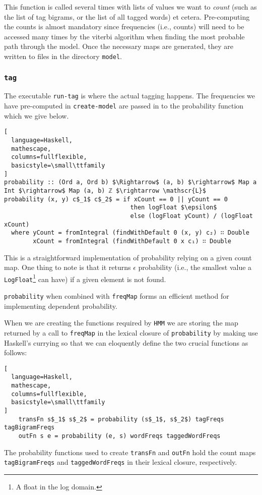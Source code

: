 \documentclass{article}
\begin{document}
This function is called several times with lists of values we want to
\emph{count} (such as the list of tag bigrams, or the list of all tagged words)
et cetera. Pre-computing the counts is almost mandatory since frequencies (i.e.,
counts) will need to be accessed many times by the viterbi algorithm when
finding the most probable path through the model. Once the necessary maps are
generated, they are written to files in the directory \texttt{model}.

\subsubsection{\texttt{tag}}
\label{par:tag}

The executable \texttt{run-tag} is where the actual tagging happens. The
frequencies we have pre-computed in \texttt{create-model} are passed in to the
probability function which we give below.
\begin{lstlisting}[
  language=Haskell,
  mathescape,
  columns=fullflexible,
  basicstyle=\small\ttfamily
]
probability :: (Ord a, Ord b) $\Rightarrow$ (a, b) $\rightarrow$ Map a Int $\rightarrow$ Map (a, b) ℤ $\rightarrow \mathscr{L}$
probability (x, y) c$_1$ c$_2$ = if xCount == 0 || yCount == 0
                                   then logFloat $\epsilon$
                                   else (logFloat yCount) / (logFloat xCount)
  where yCount = fromIntegral (findWithDefault 0 (x, y) c₂) ∷ Double
        xCount = fromIntegral (findWithDefault 0 x c₁) ∷ Double
\end{lstlisting}
This is a straightforward implementation of probability relying on a given count
map. One thing to note is that it returns $\epsilon$ probability (i.e., the
smallest value a \texttt{LogFloat}\footnote{A float in the log domain.} can have) if a given element is not found.

\texttt{probability} when combined with \texttt{freqMap} forms an efficient
method for implementing dependent probability.

When we are creating the functions required by \texttt{HMM} we are storing the
map returned by a call to \texttt{freqMap} in the lexical closure of
\texttt{probability} by making use Haskell's currying so that we can eloquently
define the two crucial functions as follows:
\begin{lstlisting}[
  language=Haskell,
  mathescape,
  columns=fullflexible,
  basicstyle=\small\ttfamily
]
    transFn s$_1$ s$_2$ = probability (s$_1$, s$_2$) tagFreqs tagBigramFreqs
    outFn s e = probability (e, s) wordFreqs taggedWordFreqs
\end{lstlisting}
The probability functions used to create \texttt{transFn} and \texttt{outFn}
hold the count maps \texttt{tagBigramFreqs} and \texttt{taggedWordFreqs} in
their lexical closure, respectively.
\end{document}
